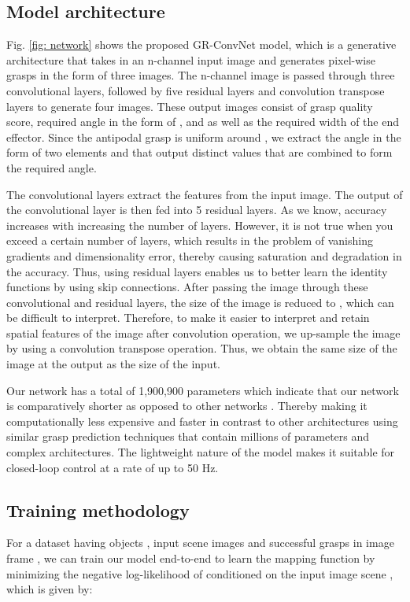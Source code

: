 \documentclass[letterpaper, 10 pt, conference]{ieeeconf}
\begin{document}
\subsection{Model architecture}
Fig. \ref{fig: network} shows the proposed GR-ConvNet model, which is a generative architecture that takes in an n-channel input image and generates pixel-wise grasps in the form of three images. The n-channel image is passed through three convolutional layers, followed by five residual layers and convolution transpose layers to generate four images. These output images consist of grasp quality score, required angle in the form of , and  as well as the required width of the end effector. Since the antipodal grasp is uniform around , we extract the angle in the form of two elements  and  that output distinct values that are combined to form the required angle.

The convolutional layers extract the features from the input image. The output of the convolutional layer is then fed into 5 residual layers. As we know, accuracy increases with increasing the number of layers. However, it is not true when you exceed a certain number of layers, which results in the problem of vanishing gradients and dimensionality error, thereby causing saturation and degradation in the accuracy. Thus, using residual layers enables us to better learn the identity functions by using skip connections. After passing the image through these convolutional and residual layers, the size of the image is reduced to , which can be difficult to interpret. Therefore, to make it easier to interpret and retain spatial features of the image after convolution operation, we up-sample the image by using a convolution transpose operation. Thus, we obtain the same size of the image at the output as the size of the input. 

Our network has a total of 1,900,900 parameters which indicate that our network is comparatively shorter as opposed to other networks \cite{kumra2017robotic, zhou2018fully, Asif2018EnsembleNetIG}. Thereby making it computationally less expensive and faster in contrast to other architectures using similar grasp prediction techniques that contain millions of parameters and complex architectures. The lightweight nature of the model makes it suitable for closed-loop control at a rate of up to 50 Hz.

\subsection{Training methodology}
For a dataset having objects , input scene images  and successful grasps in image frame , we can train our model end-to-end to learn the mapping function  by minimizing the negative log-likelihood of  conditioned on the input image scene , which is given by:
\end{document}
